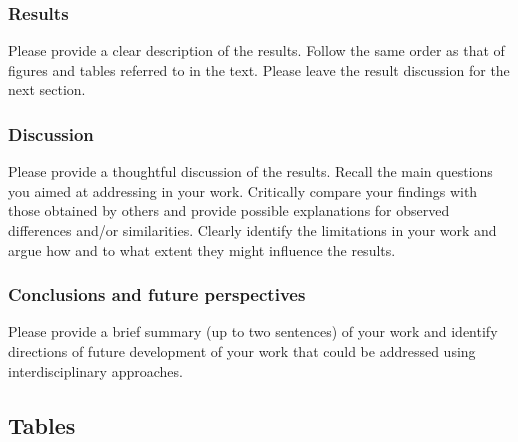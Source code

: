 \documentclass{jmoarticle}
\begin{document}
\subsubsection{Results}
Please provide a clear description of the results. Follow the same order as
that of figures and tables referred to in the text. Please leave the result
discussion for the next section.

\subsubsection{Discussion}
Please provide a thoughtful discussion of the results. Recall the main
questions you aimed at addressing in your work. Critically compare your
findings with those obtained by others and provide possible explanations for
observed differences and/or similarities. Clearly identify the limitations in
your work and argue how and to what extent they might influence the results.

\subsubsection{Conclusions and future perspectives}
Please provide a brief summary (up to two sentences) of your work and identify
directions of future development of your work that could be addressed using
interdisciplinary approaches.


\subsection{Tables}
\end{document}
